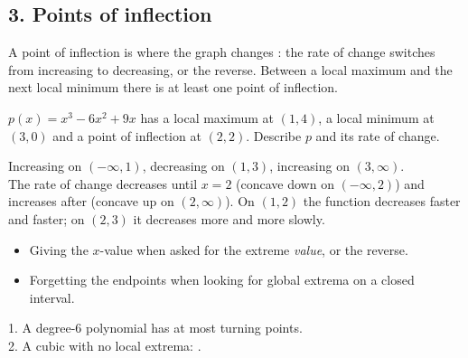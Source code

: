\subsection*{3. Points of inflection}
\begin{keyidea}
A point of inflection is where the graph changes : the rate of change switches from increasing to decreasing, or the reverse. Between a local maximum and the next local minimum there is at least one point of inflection.
\end{keyidea}

$p(x)=x^3-6x^2+9x$ has a local maximum at $(1,4)$, a local minimum at $(3,0)$ and a point of inflection at $(2,2)$. Describe $p$ and its rate of change.
\begin{workspace}[3.2cm]
Increasing on $(-\infty,1)$, decreasing on $(1,3)$, increasing on $(3,\infty)$.\\
The rate of change decreases until $x=2$ (concave down on $(-\infty,2)$) and increases after (concave up on $(2,\infty)$). On $(1,2)$ the function decreases faster and faster; on $(2,3)$ it decreases more and more slowly.
\end{workspace}

\begin{mistakes}
\begin{itemize}
\item Giving the $x$-value when asked for the extreme \emph{value}, or the reverse.
\item Forgetting the endpoints when looking for global extrema on a closed interval.
\end{itemize}
\end{mistakes}

\begin{quickcheck}
1. A degree-6 polynomial has at most  turning points.\\
2. A cubic with no local extrema: .
\end{quickcheck}


